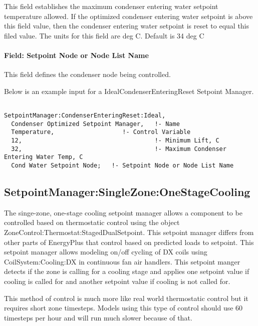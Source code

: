 This field establishes the maximum condenser entering water setpoint temperature allowed. If the optimized condenser entering water setpoint is above this field value, then the condenser entering water setpoint is reset to equal this filed value. The units for this field are deg C. Default is 34 deg C

\paragraph{Field: Setpoint Node or Node List Name}\label{field-setpoint-node-or-node-list-name-1}

This field defines the condenser node being controlled.

Below is an example input for a IdealCondenserEnteringReset Setpoint Manager.

\begin{lstlisting}

SetpointManager:CondenserEnteringReset:Ideal,
  Condenser Optimized Setpoint Manager,   !- Name
  Temperature,                   !- Control Variable
  12,                                     !- Minimum Lift, C
  32,                                     !- Maximum Condenser Entering Water Temp, C
  Cond Water Setpoint Node;   !- Setpoint Node or Node List Name
\end{lstlisting}

\subsection{SetpointManager:SingleZone:OneStageCooling}\label{setpointmanagersinglezoneonestagecooling}

The singe-zone, one-stage cooling setpoint manager allows a component to be controlled based on thermostatic control using the object ZoneControl:Thermostat:StagedDualSetpoint. This setpoint manager differs from other parts of EnergyPlus that control based on predicted loads to setpoint. This setpoint manager allows modeling on/off cycling of DX coils using CoilSystem:Cooling:DX in continuous fan air handlers. This setpoint manger detects if the zone is calling for a cooling stage and applies one setpoint value if cooling is called for and another setpoint value if cooling is not called for.

This method of control is much more like real world thermostatic control but it requires short zone timesteps. Models using this type of control should use 60 timesteps per hour and will run much slower because of that.

